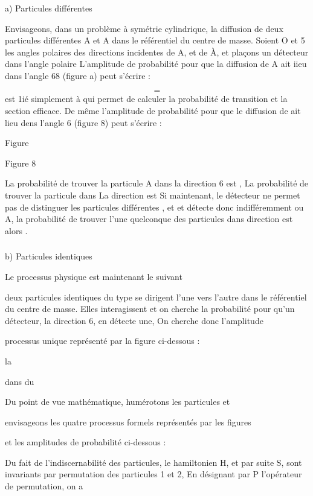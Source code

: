 {{{\subsubsection{}%
a) Particules différentes

Envisageons, dans un problème à symétrie cylindrique, la diffusion de deux
particules différentes A et A dans le référentiel
du centre de masse. Soient O et 5 les angles polaires des directions
incidentes de A, et de À, et plaçons un détecteur dans l'angle polaire 
L'amplitude de probabilité pour que la diffusion de A ait iieu dans l'angle 68
(figure a) peut s'écrire :

\[
\tag{8}=
\]
 est 1ié simplement  à  qui permet de calculer la probabilité de transition et
 la section efficace.
De même l'amplitude de probabilité pour que le diffusion de
ait lieu dens l'angle 6 (figure 8) peut s'écrire :

Figure

Figure 8

La probabilité de trouver la particule A dans la
direction 6 est , La probabilité de trouver la particule  dans La direction  est
 Si maintenant,
le détecteur ne permet pas de distinguer les particules différentes , et  et
détecte donc indifféremment  ou A, la
probabilité de trouver l'une quelconque des particules dans
direction  est alors .
\subsubsection{}%
b) Particules identiques

Le processus physique est maintenant le suivant

deux particules identiques du type  se dirigent l'une vers
l'autre dans le référentiel du centre de masse. Elles interagissent et on cherche
la probabilité pour qu'un détecteur,
la direction 6, en détecte une, On cherche donc l'amplitude

processus unique représenté par la figure ci-dessous :

la

dans
du

 

Du point de vue mathématique, humérotons les particules et

envisageons les quatre processus formels représentés par les figures

et les amplitudes de probabilité ci-dessous :


Du fait de l'indiscernabilité des particules, le
hamiltonien H, et par suite S, sont invariants par permutation
des particules 1 et 2, En désignant par P l'opérateur de permutation, on a

}}}

